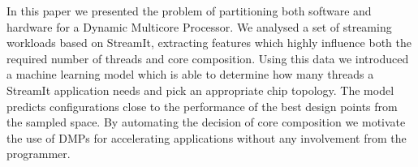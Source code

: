 In this paper we presented the problem of partitioning both software and hardware for a Dynamic Multicore Processor.
We analysed a set of streaming workloads based on StreamIt, extracting features which highly influence both the required number of threads and core composition.
Using this data we introduced a machine learning model which is able to determine how many threads a StreamIt application needs and pick an appropriate chip topology.
The model predicts configurations close to the performance of the best design points from the sampled space.
By automating the decision of core composition we motivate the use of DMPs for accelerating applications without any involvement from the programmer.
